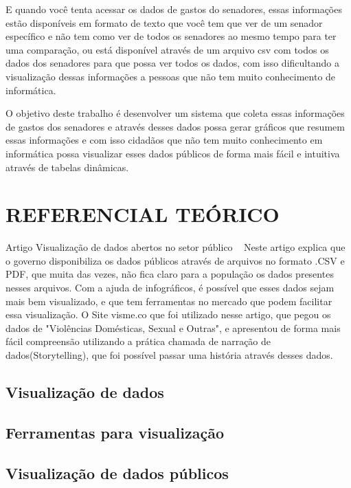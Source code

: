 E quando você tenta acessar os dados de gastos do senadores, essas informações estão disponíveis em formato de texto que você tem que ver de um senador específico e não tem como ver de todos os senadores ao mesmo tempo para ter uma comparação, ou está disponível através de um arquivo csv com todos os dados dos senadores para que possa ver todos os dados, com isso dificultando a visualização dessas informações a pessoas que não tem muito conhecimento de informática.  

O  objetivo deste trabalho é desenvolver um sistema que coleta essas informações de gastos dos senadores e através desses dados possa gerar gráficos que resumem essas informações e com isso cidadãos que não tem muito conhecimento em informática possa visualizar esses dados públicos de forma mais fácil e intuitiva através de tabelas dinâmicas.




\section{\esp REFERENCIAL TEÓRICO}

Artigo Visualização de dados abertos no setor público ~\cite{Silva:2018} 
Neste artigo explica que o governo disponibiliza os dados públicos através de arquivos no formato .CSV e PDF, que muita das vezes, não fica claro para a população os dados presentes nesses arquivos. Com a ajuda de infográficos, é possível que esses dados sejam mais bem visualizado, e que tem ferramentas no mercado que podem facilitar essa visualização. O Site visme.co que foi utilizado nesse artigo, que pegou os dados de "Violências  Domésticas,  Sexual  e  Outras", e apresentou de forma mais fácil compreensão utilizando a prática chamada de narração de dados(Storytelling), que foi possível passar uma história através desses dados. 

\subsection{\esp Visualização de dados}



\subsection{\esp Ferramentas para visualização}



\subsection{\esp Visualização de dados públicos}
 
